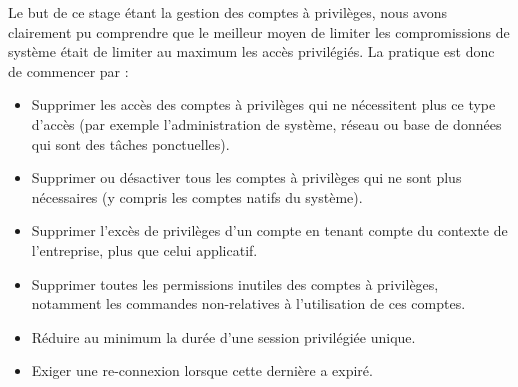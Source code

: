 Le but de ce stage étant la gestion des comptes à privilèges, nous avons clairement pu comprendre que le meilleur moyen de limiter les compromissions de système était de limiter au maximum les accès privilégiés. La pratique est donc de commencer par :
\begin{itemize}
	\item Supprimer les accès des comptes à privilèges qui ne nécessitent plus ce type d'accès (par exemple l'administration de système, réseau ou base de données qui sont des tâches ponctuelles).
	\item Supprimer ou désactiver tous les comptes à privilèges qui ne sont plus nécessaires (y compris les comptes natifs du système).
	\item Supprimer l'excès de privilèges d'un compte en tenant compte du contexte de l'entreprise, plus que celui applicatif.
	\item Supprimer toutes les permissions inutiles des comptes à privilèges, notamment les commandes non-relatives à l'utilisation de ces comptes.
	\item Réduire au minimum la durée d'une session privilégiée unique.
	\item Exiger une re-connexion lorsque cette dernière a expiré.
\end{itemize}


